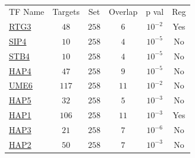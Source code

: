 \begin{table}[h!]
\centering 
{}
\begin{tabular}{l c c c c c}
\hline

TF Name &	Targets &	Set &	Overlap &	p val &	Reg \\ 
\href{www.yeastgenome.org/cgi-bin/locus.fpl?locus=RTG3}{RTG3} &	 $48$ &	$258$&	$6$ &	$10^{-2}$ & 	 Yes \\ 
\href{www.yeastgenome.org/cgi-bin/locus.fpl?locus=SIP4}{SIP4} &	 $10$ &	$258$&	$4$ &	$10^{-5}$ & 	 No \\ 
\href{www.yeastgenome.org/cgi-bin/locus.fpl?locus=STB4}{STB4} &	 $10$ &	$258$&	$4$ &	$10^{-5}$ & 	 No \\ 
\href{www.yeastgenome.org/cgi-bin/locus.fpl?locus=HAP4}{HAP4} &	 $47$ &	$258$&	$9$ &	$10^{-5}$ & 	 No \\ 
\href{www.yeastgenome.org/cgi-bin/locus.fpl?locus=UME6}{UME6} &	 $117$ &	$258$&	$11$ &	$10^{-2}$ & 	 No \\ 
\href{www.yeastgenome.org/cgi-bin/locus.fpl?locus=HAP5}{HAP5} &	 $32$ &	$258$&	$5$ &	$10^{-3}$ & 	 No \\ 
\href{www.yeastgenome.org/cgi-bin/locus.fpl?locus=HAP1}{HAP1} &	 $106$ &	$258$&	$11$ &	$10^{-3}$ & 	 Yes \\ 
\href{www.yeastgenome.org/cgi-bin/locus.fpl?locus=HAP3}{HAP3} &	 $21$ &	$258$&	$7$ &	$10^{-6}$ & 	 No \\ 
\href{www.yeastgenome.org/cgi-bin/locus.fpl?locus=HAP2}{HAP2} &	 $50$ &	$258$&	$7$ &	$10^{-3}$ & 	 No \\ 
\hline
\end{tabular} 
\caption[]{}
\label{}
\end{table} 


